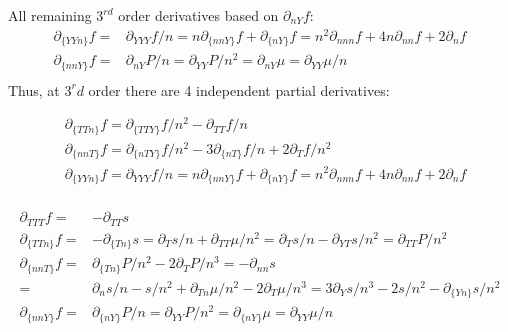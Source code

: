 \documentclass[11pt,letter]{article}
\begin{document}
All remaining $3^{rd}$ order derivatives based on $\partial_{nY}f$:
\begin{equation}
 \begin{split}
  \partial_{\{YYn\}}f=&\partial_{YYY}f/n=n\partial_{\{nnY\}}f+\partial_{\{nY\}}f=n^2\partial_{nnn}f+4n\partial_{nn}f+2\partial_{n}f\\
  \partial_{\{nnY\}}f=&\partial_{nY}P/n=\partial_{YY}P/n^2=\partial_{nY}\mu=\partial_{YY}\mu/n\\
 \end{split}
\end{equation}
Thus, at $3^rd$ order there are 4 independent partial derivatives:
\begin{mdframed}
\begin{equation}
 \begin{split}
  &\partial_{\{TTn\}}f=\partial_{\{TTY\}}f/n^2-\partial_{TT}f/n\\
  &\partial_{\{nnT\}}f=\partial_{\{nTY\}}f/n^2-3\partial_{\{nT\}}f/n+2\partial_{T}f/n^2\\
  &\partial_{\{YYn\}}f=\partial_{YYY}f/n=n\partial_{\{nnY\}}f+\partial_{\{nY\}}f=n^2\partial_{nnn}f+4n\partial_{nn}f+2\partial_{n}f\\
 \end{split}
\end{equation} 
\end{mdframed}

\begin{mdframed}
\begin{equation}
 \begin{split}
  \partial_{TTT}f=&-\partial_{TT}s\\
  \partial_{\{TTn\}}f=&-\partial_{\{Tn\}}s=\partial_Ts/n+\partial_{TT}\mu/n^2 = \partial_Ts/n-\partial_{YT}s/n^2=\partial_{TT}P/n^2\\ 
  \partial_{\{nnT\}}f=&\partial_{\{Tn\}}P/n^2-2\partial_{T}P/n^3=-\partial_{nn}s\\
  =&\partial_{n}s/n-s/n^2+\partial_{Tn}\mu/n^2-2\partial_{T}\mu/n^3=3\partial_Ys/n^3-2s/n^2-\partial_{\{Yn\}}s/n^2\\
  \partial_{\{nnY\}}f=&\partial_{\{nY\}}P/n=\partial_{YY}P/n^2=\partial_{\{nY\}}\mu=\partial_{YY}\mu/n
 \end{split}
\end{equation} 
\end{mdframed}
\end{document}
